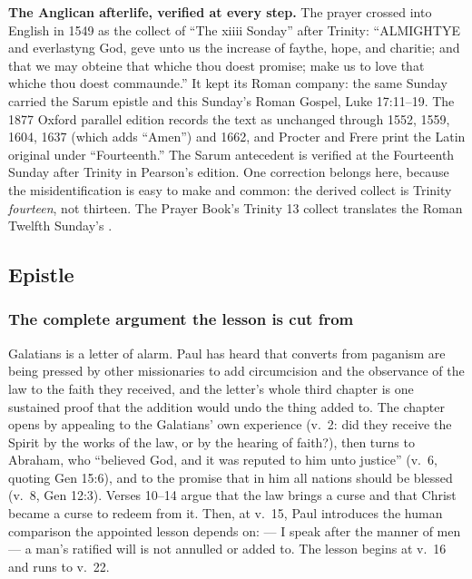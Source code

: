 \textbf{The Anglican afterlife, verified at every step.} The prayer crossed
into English in 1549 as the collect of ``The xiiii Sonday'' after Trinity:
``ALMIGHTYE and everlastyng God, geve unto us the increase of faythe, hope, and
charitie; and that we may obteine that whiche thou doest promise; make us to
love that whiche thou doest commaunde.'' It kept its Roman company: the same
Sunday carried the Sarum epistle and this Sunday's Roman Gospel, Luke
17:11--19. The 1877 Oxford parallel edition records the text as unchanged
through 1552, 1559, 1604, 1637 (which adds ``Amen'') and 1662, and Procter and
Frere print the Latin original under ``Fourteenth.'' The Sarum antecedent is
verified at the Fourteenth Sunday after Trinity in Pearson's edition. One
correction belongs here, because the misidentification is easy to make and
common: the derived collect is Trinity \textit{fourteen}, not thirteen. The
Prayer Book's Trinity 13 collect translates the Roman Twelfth Sunday's
.

\elementguard
\subsection*{Epistle }


\subsubsection*{The complete argument the lesson is cut from}

Galatians is a letter of alarm. Paul has heard that converts from paganism are
being pressed by other missionaries to add circumcision and the observance of
the law to the faith they received, and the letter's whole third chapter is
one sustained proof that the addition would undo the thing added to. The
chapter opens by appealing to the Galatians' own experience (v.~2: did they
receive the Spirit by the works of the law, or by the hearing of faith?), then
turns to Abraham, who ``believed God, and it was reputed to him unto justice''
(v.~6, quoting Gen 15:6), and to the promise that in him all nations should be
blessed (v.~8, Gen 12:3). Verses 10--14 argue that the law brings a curse and
that Christ became a curse to redeem from it. Then, at v.~15, Paul introduces
the human comparison the appointed lesson depends on:  --- I speak after the manner of men --- a man's ratified will is not
annulled or added to. The lesson begins at v.~16 and runs to v.~22.

